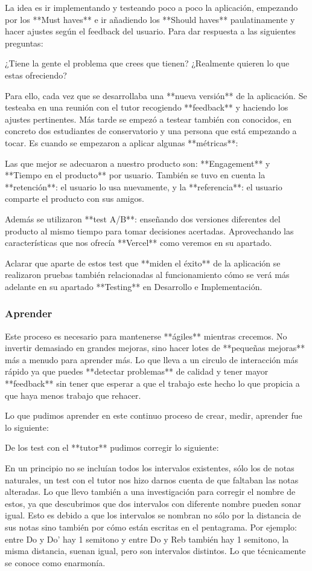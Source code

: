 \documentclass[12pt,twoside,titlepage]{report}
\begin{document}
La idea es ir implementando y testeando poco a poco la aplicación, empezando por los **Must haves** e ir añadiendo los **Should haves** paulatinamente y hacer ajustes según el feedback del usuario. Para dar respuesta a las siguientes preguntas:

¿Tiene la gente el problema que crees que tienen? ¿Realmente quieren lo que estas ofreciendo?

Para ello, cada vez que se desarrollaba una **nueva versión** de la aplicación. Se testeaba en una reunión con el tutor recogiendo **feedback** y haciendo los ajustes pertinentes. Más tarde se empezó a testear también con conocidos, en concreto dos estudiantes de conservatorio y una persona que está empezando a tocar. Es cuando se empezaron a aplicar algunas **métricas**:

Las que mejor se adecuaron a nuestro producto son: **Engagement** y **Tiempo en el producto** por usuario. También se tuvo en cuenta la **retención**: el usuario lo usa nuevamente, y la **referencia**: el usuario comparte el producto con sus amigos.

Además se utilizaron **test A/B**: enseñando dos versiones diferentes del producto al mismo tiempo para tomar decisiones acertadas. Aprovechando las características que nos ofrecía **Vercel** como veremos en su apartado.

Aclarar que aparte de estos test que **miden el éxito** de la aplicación se realizaron pruebas también relacionadas al funcionamiento cómo se verá más adelante en su apartado **Testing** en Desarrollo e Implementación.

\subsubsection{Aprender}

Este proceso es necesario para mantenerse **ágiles** mientras crecemos. No invertir demasiado en grandes mejoras, sino hacer lotes de **pequeñas mejoras** más a menudo para aprender más. Lo que lleva a un circulo de interacción más rápido ya que puedes **detectar problemas** de calidad y tener mayor **feedback** sin tener que esperar a que el trabajo este hecho lo que propicia a que haya menos trabajo que rehacer.

Lo que pudimos aprender en este continuo proceso de crear, medir, aprender fue lo siguiente:

De los test con el **tutor** pudimos corregir lo siguiente:

En un principio no se incluían todos los intervalos existentes, sólo los de notas naturales, un test con el tutor nos hizo darnos cuenta de que faltaban las notas alteradas. Lo que llevo también a una investigación para corregir el nombre de estos, ya que descubrimos que dos intervalos con diferente nombre pueden sonar igual. Esto es debido a que los intervalos se nombran no sólo por la distancia de sus notas sino también por cómo están escritas en el pentagrama. Por ejemplo: entre Do y Do' hay 1 semitono y entre Do y Reb también hay 1 semitono, la misma distancia, suenan igual, pero son intervalos distintos. Lo que técnicamente se conoce como enarmonía.
\end{document}
